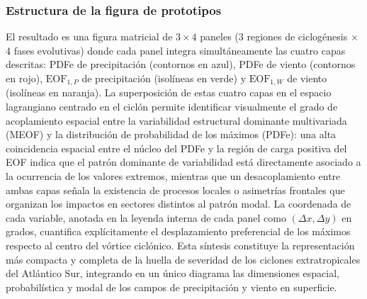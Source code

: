 \subsubsection{Estructura de la figura de prototipos}

El resultado es una figura matricial de $3 \times 4$ paneles (3 regiones de ciclogénesis $\times$ 4 fases evolutivas) donde cada panel integra simultáneamente las cuatro capas descritas: PDFe de precipitación (contornos en azul), PDFe de viento (contornos en rojo), $\text{EOF}_{1,P}$ de precipitación (isolíneas en verde) y $\text{EOF}_{1,W}$ de viento (isolíneas en naranja). 
La superposición de estas cuatro capas en el espacio lagrangiano centrado en el ciclón permite identificar visualmente el grado de acoplamiento espacial entre la variabilidad estructural dominante multivariada (MEOF) y la distribución de probabilidad de los máximos (PDFe): una alta coincidencia espacial entre el núcleo del PDFe y la región de carga positiva del EOF indica que el patrón dominante de variabilidad está directamente asociado a la ocurrencia de los valores extremos, mientras que un desacoplamiento entre ambas capas señala la existencia de procesos locales o asimetrías frontales que organizan los impactos en 
sectores distintos al patrón modal. 
La coordenada de cada variable, anotada en la leyenda interna de cada panel como $(\Delta x, \Delta y)$ en grados, cuantifica explícitamente el desplazamiento preferencial de los máximos respecto al centro del vórtice ciclónico. Esta síntesis constituye la representación más compacta y completa de la huella de severidad de los ciclones extratropicales del Atlántico Sur, integrando en un único diagrama las dimensiones espacial, probabilística y modal de los campos de precipitación y viento en superficie.
